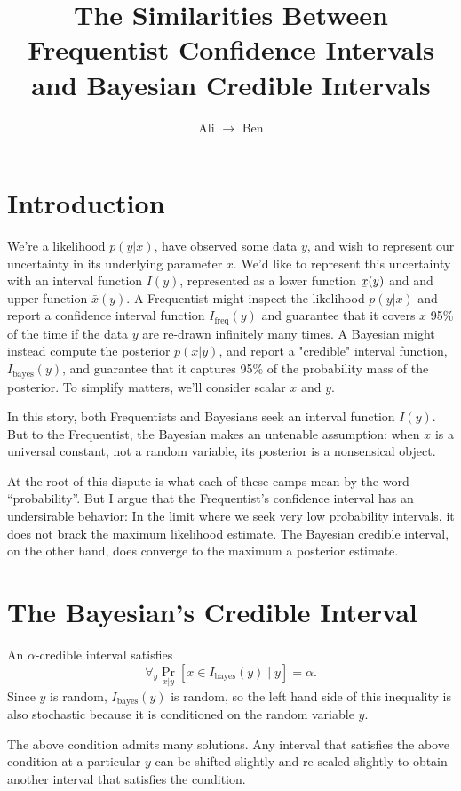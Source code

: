 \documentclass{article}
\title{The Similarities Between Frequentist Confidence Intervals and Bayesian Credible Intervals}
\author{Ali $\to$ Ben}
\newcommand{\Ifreq}{I_\text{freq}}
\newcommand{\Ibayes}{I_\text{bayes}}
\newcommand{\xl}{\underaccent{\bar}{x}}
\newcommand{\xh}{\bar{x}}
\newcommand{\1}{\mathbf{1}}
\begin{document}
\maketitle

\section{Introduction}

We're a likelihood $p(y|x)$, have observed some data $y$, and wish to represent
our uncertainty in its underlying parameter $x$. We'd like to represent this
uncertainty with an interval function $I(y)$, represented as a lower function
$\xl(y)$ and and upper function $\xh(y)$. A Frequentist might inspect the
likelihood $p(y|x)$ and report a confidence interval function $\Ifreq(y)$ and
guarantee that it covers $x$ 95\% of the time if the data $y$ are re-drawn
infinitely many times.  A Bayesian might instead compute the posterior
$p(x|y)$, and report a "credible" interval function, $\Ibayes(y)$, and
guarantee that it captures 95\% of the probability mass of the posterior.
To simplify matters, we'll consider scalar $x$ and $y$.

In this story, both Frequentists and Bayesians seek an interval function
$I(y)$. But to the Frequentist, the Bayesian makes an untenable assumption:
when $x$ is a universal constant, not a random variable, its posterior is a
nonsensical object.

At the root of this dispute is what each of these camps mean by the word
``probability''.  But I argue that the Frequentist's confidence interval has an
undersirable behavior: In the limit where we seek very low probability
intervals, it does not brack the maximum likelihood estimate. The Bayesian
credible interval, on the other hand, does converge to the maximum a
posterior estimate.


\section{The Bayesian's Credible Interval}

An $\alpha$-credible interval satisfies
\[
\forall_y \Pr_{x|y}\left[ x \in \Ibayes(y) \;|\; y\right] = \alpha.
\]
Since $y$ is random, $\Ibayes(y)$ is random, so the left hand side of this
inequality is also stochastic because it is conditioned on the random variable
$y$. 

The above condition admits many solutions. Any interval
that satisfies the above condition at a particular $y$
can be shifted slightly and re-scaled slightly to obtain
another interval that satisfies the condition.
\end{document}
